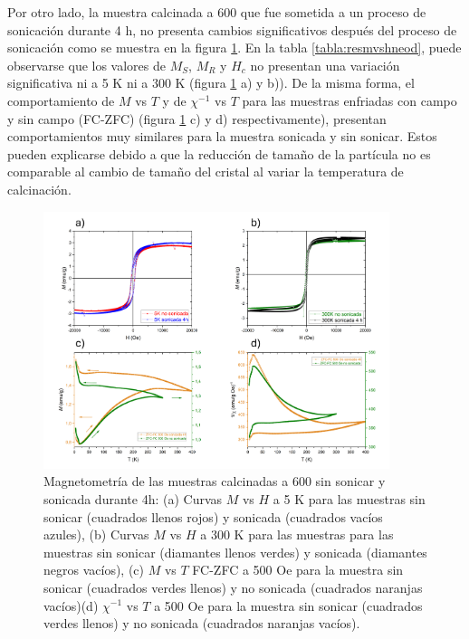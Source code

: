 \documentclass[../main.tex]{subfiles}
\begin{document}
Por otro lado, la muestra calcinada a 600\gradoC{} que fue sometida a un proceso de sonicación durante 4 h, no presenta cambios significativos después del proceso de sonicación como se muestra en la figura \ref{fig:mvhNdsonic}. En la tabla \ref{tabla:resmvshneod}, puede observarse que los valores de $M_S$, $M_R$ y $H_c$ no presentan una variación significativa ni a 5 K ni a 300 K (figura \ref{fig:mvhNdsonic} a) y b)). De la misma forma, el comportamiento de $M$ vs $T$ y de $\chi^{-1}$ vs $T$ para las muestras enfriadas con campo y sin campo (FC-ZFC) (figura \ref{fig:mvhNdsonic} c) y d) respectivamente), presentan comportamientos muy similares para la muestra sonicada y sin sonicar. Estos pueden explicarse debido a que la reducción de tamaño de la partícula no es comparable al cambio de tamaño del cristal al variar la temperatura de calcinación.

\begin{figure}[H]
	\centering
	\includegraphics[width=0.9\textwidth]{fig/Magnetometria_NdFeO3_sonic.png}
	\caption{Magnetometría de las muestras \neod{} calcinadas a 600\gradoC{} sin sonicar y sonicada durante 4h: (a) Curvas $M$ vs $H$ a 5 K para las muestras sin sonicar  (cuadrados llenos rojos) y sonicada (cuadrados vacíos azules), (b) Curvas $M$ vs $H$ a 300 K para las muestras para las muestras sin sonicar  (diamantes llenos verdes) y sonicada (diamantes negros vacíos), (c) $M$ vs $T$ FC-ZFC a 500 Oe para la muestra sin sonicar (cuadrados verdes llenos) y no sonicada (cuadrados naranjas vacíos)(d) $\chi^{-1}$ vs $T$ a 500 Oe para la muestra sin sonicar (cuadrados verdes llenos) y no sonicada (cuadrados naranjas vacíos).}
	\label{fig:mvhNdsonic}
\end{figure}
\end{document}
